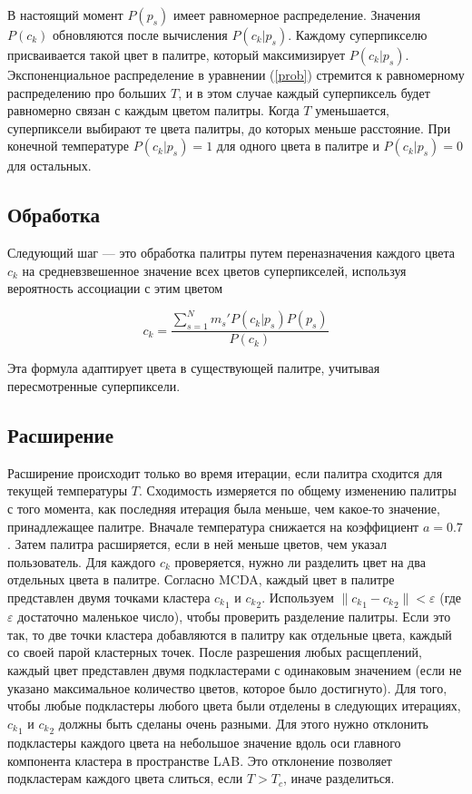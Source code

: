 \documentclass[a4paper,12pt]{report}
\theoremstyle{remark}
\begin{document}
В настоящий момент $P(p_s)$ имеет равномерное распределение. Значения $P(c_k)$ обновляются после вычисления $P(c_k|p_s)$. Каждому суперпикселю присваивается такой цвет в палитре, который максимизирует $P(c_k|p_s)$. Экспоненциальное распределение в уравнении (\ref{prob}) стремится к равномерному распределению про больших $T$, и в этом случае каждый суперпиксель будет равномерно связан с каждым цветом палитры. Когда $T$ уменьшается, суперпиксели выбирают те цвета палитры, до которых меньше расстояние. При конечной температуре $P(c_k|p_s) = 1$ для одного цвета в палитре и $P(c_k|p_s) = 0$ для остальных.

\subsection{Обработка}

Следующий шаг — это обработка палитры путем переназначения каждого цвета $c_k$ на средневзвешенное значение всех цветов суперпикселей, используя вероятность ассоциации с этим цветом

\begin{equation}
c_k = \frac{\sum_{s=1}^{N}m_s'P(c_k|p_s)P(p_s)}{P(c_k)}
\end{equation}

Эта формула адаптирует цвета в существующей палитре, учитывая пересмотренные суперпиксели. 

\subsection{Расширение}

Расширение происходит только во время итерации, если палитра сходится для текущей температуры $T$. Сходимость измеряется по общему изменению палитры с того момента, как последняя итерация была меньше, чем какое-то значение, принадлежащее палитре. Вначале температура снижается на коэффициент $a=0.7$. Затем палитра расширяется, если в ней меньше цветов, чем указал пользователь. Для каждого $c_k$ проверяется, нужно ли разделить цвет на два отдельных цвета в палитре. Согласно MCDA, каждый цвет в палитре представлен двумя точками кластера ${c_k}_1$ и ${c_k}_2$. Используем $\| {c_k}_1 - {c_k}_2 \| < \varepsilon$ (где $\varepsilon$ достаточно маленькое число), чтобы проверить разделение палитры. Если это так, то две точки кластера добавляются в палитру как отдельные цвета, каждый со своей парой кластерных точек.
После разрешения любых расщеплений, каждый цвет представлен двумя подкластерами с одинаковым значением (если не указано максимальное количество цветов, которое было достигнуто). Для того, чтобы любые подкластеры любого цвета были отделены в следующих итерациях,  ${c_k}_1$ и ${c_k}_2$ должны быть сделаны очень разными. Для этого нужно отклонить подкластеры каждого цвета на небольшое значение вдоль оси главного компонента кластера в пространстве LAB. Это отклонение позволяет подкластерам каждого цвета слиться, если $T > T_c$, иначе разделиться.
\end{document}
